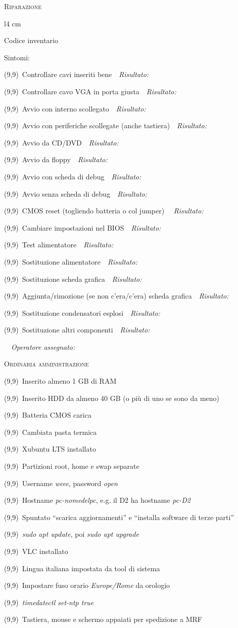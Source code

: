 \documentclass[a4paper,12pt,twoside]{article}
\newcommand{\rulespace}[1]{\ \ \textit{\small #1} \hrulefill\par}
\renewcommand{\r}{\rulespace{Risultato:}}
\renewcommand{\c}{\framebox(9,9){}\, }
\newcommand{\ci}{\hspace{1cm}\c} %
\begin{document}
\thispagestyle{empty}
{\Large\textsc{Riparazione}}\par
\begin{wrapfigure}{l}{4 cm}
	\vspace{-0.5cm}
	\begin{framed}
		\begin{centering}
		{\footnotesize Codice inventario\par}
		\vspace{2.4cm}
		\end{centering}		
	\end{framed}
	\vspace{-1.4cm}
\end{wrapfigure}
Sintomi: \hrulefill\par
\hrulefill\par
\c Controllare cavi inseriti bene\r
\c Controllare cavo VGA in porta giusta\r
\c Avvio con interno scollegato\r
\c Avvio con periferiche scollegate (anche tastiera)\r
\c Avvio da CD/DVD\r
\c Avvio da floppy\r
\c Avvio con scheda di debug\r
\c Avvio senza scheda di debug\r
\c CMOS reset (togliendo batteria o col jumper) \r
\c Cambiare impostazioni nel BIOS\r
\c Test alimentatore\r
\c Sostituzione alimentatore\r
\c Sostituzione scheda grafica\r
\c Aggiunta/rimozione (se non c'era/c'era) scheda grafica\r
\c Sostituzione condensatori esplosi\r
\c Sostituzione altri componenti\r
\rulespace{Operatore assegnato:}
{\Large\textsc{Ordinaria amministrazione}}\par
\c Inserito almeno 1 GB di RAM\par
\c Inserito HDD da almeno 40 GB (o più di uno se sono da meno)\par
\c Batteria CMOS carica\par
\c Cambiata pasta termica\par
\c Xubuntu LTS installato\par
\ci Partizioni root, home e swap separate\par
\ci Username \textit{weee}, password \textit{open}\par
\ci Hostname \textit{pc-nomedelpc}, e.g. il D2 ha hostname \textit{pc-D2}\par
\ci Spuntato ``scarica aggiornamenti'' e ``installa software di terze parti''\par
\ci \textit{sudo apt update}, poi \textit{sudo apt upgrade}\par
\ci VLC installato\par
\ci Lingua italiana impostata da tool di sistema\par
\ci Impostare fuso orario \textit{Europe/Rome} da orologio\par
\ci \textit{timedatectl set-ntp true}\par
\c Tastiera, mouse e schermo appaiati per spedizione a MRF
\end{document}
